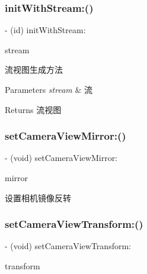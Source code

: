 \subsubsection{\texorpdfstring{init\+With\+Stream\+:()}{initWithStream:()}}
{\footnotesize\ttfamily -\/ (id) init\+With\+Stream\+: \begin{DoxyParamCaption}\item[{(\hyperlink{interface_c_c_stream}{C\+C\+Stream} $\ast$)}]{stream }\end{DoxyParamCaption}}

流视图生成方法


\begin{DoxyParams}{Parameters}
{\em stream} & 流 \\
\hline
\end{DoxyParams}
\begin{DoxyReturn}{Returns}
流视图 
\end{DoxyReturn}
\mbox{\label{interface_c_c_stream_view_acc6bbb88b8529b7e2621ca78bcdee643}} 
\subsubsection{\texorpdfstring{set\+Camera\+View\+Mirror\+:()}{setCameraViewMirror:()}}
{\footnotesize\ttfamily -\/ (void) set\+Camera\+View\+Mirror\+: \begin{DoxyParamCaption}\item[{(B\+O\+OL)}]{mirror }\end{DoxyParamCaption}}

设置相机镜像反转 \mbox{\label{interface_c_c_stream_view_a459e2ceb67d1f1c40690d64b6ea609bb}} 
\subsubsection{\texorpdfstring{set\+Camera\+View\+Transform\+:()}{setCameraViewTransform:()}}
{\footnotesize\ttfamily -\/ (void) set\+Camera\+View\+Transform\+: \begin{DoxyParamCaption}\item[{(C\+G\+Affine\+Transform)}]{transform }\end{DoxyParamCaption}}

